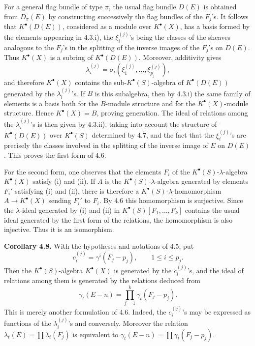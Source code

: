 For a general flag bundle of type \(\pi\), the usual flag bundle \(D(E)\) is obtained from \(D_\pi(E)\) by constructing successively the flag bundles of the \(F_j\)'s. It follows that \(K^\bullet(D(E))\), considered as a module over \(K^\bullet(X)\), has a basis formed by the elements appearing in 4.3.i), the \(\xi_i^{(j)}\)'s being the classes of the sheaves analogous to the \(F_j\)'s in the splitting of the inverse images of the \(F_j\)'s on \(D(E)\). Thus \(K^\bullet(X)\) is a subring of \(K^\bullet(D(E))\). Moreover, additivity gives
\[
  \lambda_i^{(j)}=\sigma_i(\xi_1^{(j)},\ldots,\xi_{p_j}^{(j)}),
\]
and therefore \(K^\bullet(X)\) contains the sub-\(K^\bullet(S)\)-algebra of \(K^\bullet(D(E))\) generated by the \(\lambda_i^{(j)}\)'s. If \(B\) is this subalgebra, then by 4.3.i) the same family of elements is a basis both for the \(B\)-module structure and for the \(K^\bullet(X)\)-module structure. Hence \(K^\bullet(X)=B\), proving generation. The ideal of relations among the \(\lambda_i^{(j)}\)'s is then given by 4.3.ii), taking into account the structure of \(K^\bullet(D(E))\) over \(K^\bullet(S)\) determined by 4.7, and the fact that the \(\xi_i^{(j)}\)'s are precisely the classes involved in the splitting of the inverse image of \(E\) on \(D(E)\). This proves the first form of 4.6.

For the second form, one observes that the elements \(F_i\) of the \(K^\bullet(S)\)-\(\lambda\)-algebra \(K^\bullet(X)\) satisfy (i) and (ii). If \(A\) is the \(K^\bullet(S)\)-\(\lambda\)-algebra generated by elements \(F_i'\) satisfying (i) and (ii), there is therefore a \(K^\bullet(S)\)-\(\lambda\)-homomorphism \(A\to K^\bullet(X)\) sending \(F_i'\) to \(F_i\). By 4.6 this homomorphism is surjective. Since the \(\lambda\)-ideal generated by (i) and (ii) in \(K^\bullet(S)[F_1,\ldots,F_k]\) contains the usual ideal generated by the first form of the relations, the homomorphism is also injective. Thus it is an isomorphism.

\textbf{Corollary 4.8.} With the hypotheses and notations of 4.5, put
\[
  c_i^{(j)}=\gamma^i(F_j-p_j),
  \qquad 1\leq i\leq p_j.
\]
Then the \(K^\bullet(S)\)-algebra \(K^\bullet(X)\) is generated by the \(c_i^{(j)}\)'s, and the ideal of relations among them is generated by the relations deduced from
\[
  \gamma_t(E-n)=\prod_{j=1}^{k}\gamma_t(F_j-p_j).
\]
This is merely another formulation of 4.6. Indeed, the \(c_i^{(j)}\)'s may be expressed as functions of the \(\lambda_i^{(j)}\)'s and conversely. Moreover the relation \(\lambda_t(E)=\prod\lambda_t(F_j)\) is equivalent to \(\gamma_t(E-n)=\prod\gamma_t(F_j-p_j)\).

